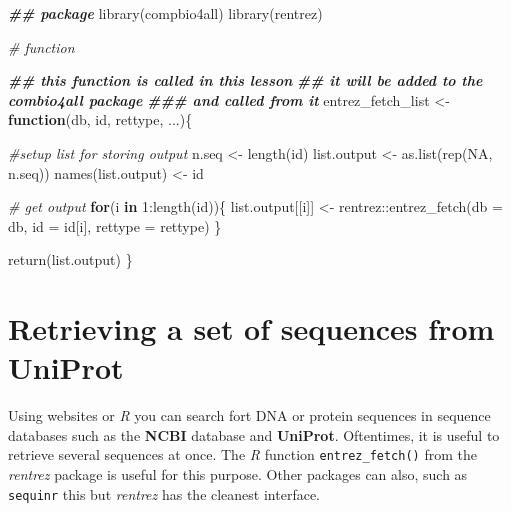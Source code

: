 \documentclass[
]{book}
\newenvironment{Shaded}{\begin{snugshade}}{\end{snugshade}}
\newcommand{\AttributeTok}[1]{\textcolor[rgb]{0.77,0.63,0.00}{#1}}
\newcommand{\CommentTok}[1]{\textcolor[rgb]{0.56,0.35,0.01}{\textit{#1}}}
\newcommand{\ConstantTok}[1]{\textcolor[rgb]{0.00,0.00,0.00}{#1}}
\newcommand{\ControlFlowTok}[1]{\textcolor[rgb]{0.13,0.29,0.53}{\textbf{#1}}}
\newcommand{\DecValTok}[1]{\textcolor[rgb]{0.00,0.00,0.81}{#1}}
\newcommand{\DocumentationTok}[1]{\textcolor[rgb]{0.56,0.35,0.01}{\textbf{\textit{#1}}}}
\newcommand{\FunctionTok}[1]{\textcolor[rgb]{0.00,0.00,0.00}{#1}}
\newcommand{\NormalTok}[1]{#1}
\newcommand{\OtherTok}[1]{\textcolor[rgb]{0.56,0.35,0.01}{#1}}
\newcommand{\SpecialCharTok}[1]{\textcolor[rgb]{0.00,0.00,0.00}{#1}}
\begin{document}
\begin{Shaded}
\begin{Highlighting}[]
\DocumentationTok{\#\# package}
\FunctionTok{library}\NormalTok{(compbio4all)}
\FunctionTok{library}\NormalTok{(rentrez)}

\CommentTok{\# function}

\DocumentationTok{\#\# this function is called in this lesson}
\DocumentationTok{\#\# it will be added to the combio4all package}
\DocumentationTok{\#\#\# and called from it}
\NormalTok{entrez\_fetch\_list }\OtherTok{\textless{}{-}} \ControlFlowTok{function}\NormalTok{(db, id, rettype, ...)\{}
  
  \CommentTok{\#setup list for storing output}
\NormalTok{  n.seq }\OtherTok{\textless{}{-}} \FunctionTok{length}\NormalTok{(id)}
\NormalTok{  list.output }\OtherTok{\textless{}{-}} \FunctionTok{as.list}\NormalTok{(}\FunctionTok{rep}\NormalTok{(}\ConstantTok{NA}\NormalTok{, n.seq))}
  \FunctionTok{names}\NormalTok{(list.output) }\OtherTok{\textless{}{-}}\NormalTok{ id}
  
  \CommentTok{\# get output}
  \ControlFlowTok{for}\NormalTok{(i }\ControlFlowTok{in} \DecValTok{1}\SpecialCharTok{:}\FunctionTok{length}\NormalTok{(id))\{}
\NormalTok{  list.output[[i]] }\OtherTok{\textless{}{-}}\NormalTok{ rentrez}\SpecialCharTok{::}\FunctionTok{entrez\_fetch}\NormalTok{(}\AttributeTok{db =}\NormalTok{ db, }
                          \AttributeTok{id =}\NormalTok{ id[i], }
                          \AttributeTok{rettype =}\NormalTok{ rettype)}
\NormalTok{  \}}
  
  
  \FunctionTok{return}\NormalTok{(list.output)}
\NormalTok{\}}
\end{Highlighting}
\end{Shaded}

\hypertarget{retrieving-a-set-of-sequences-from-uniprot}{%
\section{Retrieving a set of sequences from UniProt}\label{retrieving-a-set-of-sequences-from-uniprot}}

Using websites or \emph{R} you can search fort DNA or protein sequences in sequence databases such as the \textbf{NCBI} database and \textbf{UniProt}. Oftentimes, it is useful to retrieve several sequences at once. The \emph{R} function \texttt{entrez\_fetch()} from the \emph{rentrez} package is useful for this purpose. Other packages can also, such as \texttt{sequinr} this but \emph{rentrez} has the cleanest interface.
\end{document}
